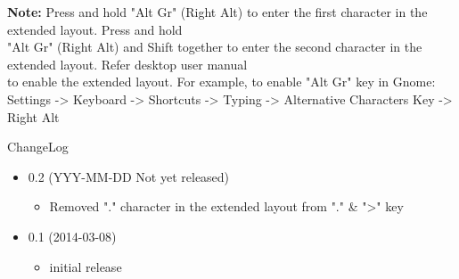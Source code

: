 \documentclass[11pt,a4paper]{article}
\begin{document}
\vspace*{1cm}

{\bfseries Note:} Press and hold "Alt Gr" (Right Alt) to enter the first character in the extended
layout.  Press and hold\\
\indent "Alt Gr" (Right Alt) and Shift together to enter the second character in the extended
layout.  Refer desktop user manual\\
\indent to enable the extended layout.  For example, to enable "Alt Gr" key in Gnome:\\
\indent Settings -> Keyboard -> Shortcuts -> Typing -> Alternative Characters Key -> Right Alt\\[2cm]

\vspace*{1cm}

{\huge ChangeLog}\\[.5cm]

\begin{itemize}
\item 0.2 (YYY-MM-DD Not yet released)
\begin{itemize}
\item Removed "." character in the extended layout from "." \& ">" key
\end{itemize}

\item 0.1 (2014-03-08)
\begin{itemize}
\item initial release
\end{itemize}
\end{itemize}
\end{document}
